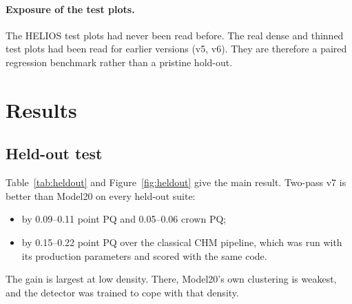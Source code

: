 \documentclass[11pt,a4paper]{article}
\begin{document}
\paragraph{Exposure of the test plots.} The HELIOS test plots had never been read before. The real dense and thinned test plots had been read for earlier versions (v5, v6). They are therefore a paired regression benchmark rather than a pristine hold-out.

\section{Results}
\label{sec:results}

\subsection{Held-out test}

Table~\ref{tab:heldout} and Figure~\ref{fig:heldout} give the main result. Two-pass v7 is better than Model20 on every held-out suite:
\begin{itemize}
  \item by 0.09--0.11 point PQ and 0.05--0.06 crown PQ;
  \item by 0.15--0.22 point PQ over the classical CHM pipeline, which was run with its production parameters and scored with the same code.
\end{itemize}
The gain is largest at low density. There, Model20's own clustering is weakest, and the detector was trained to cope with that density.
\end{document}
